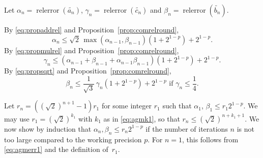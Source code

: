 \documentclass [11pt]{article}
\newcommand {\appro}[1]{\widetilde {#1}}
\newcommand{\relerror}{\operatorname {relerror}}
\renewcommand {\leq}{\leqslant}
\begin{document}
Let $\alpha_n = \relerror (\appro {a_n})$,
$\gamma_n = \relerror (\appro {c_n})$ and
$\beta_n = \relerror (\appro {b_n})$.

\noindent
By \eqref {eq:propaddrel} and Proposition~\ref {prop:comrelround},
\begin {equation}
\label {eq:agmalpha}
\alpha_n \leq
\sqrt 2 \, \max (\alpha_{n-1}, \beta_{n-1})
\left( 1 + 2^{1-p} \right) + 2^{1-p}.
\end {equation}
By \eqref {eq:propmulrel} and Proposition~\ref {prop:comrelround},
\begin {equation}
\label {eq:agmgamma}
\gamma_n \leq
\left( \alpha_{n-1} + \beta_{n-1} + \alpha_{n-1} \beta_{n-1} \right)
\left( 1 + 2^{1-p} \right) + 2^{1-p}.
\end {equation}
By \eqref {eq:propsqrt} and Proposition~\ref {prop:comrelround},
\begin {equation}
\label {eq:agmbeta}
\beta_n \leq
\frac {1}{\sqrt 3} \, \gamma_n (1 + 2^{1-p}) + 2^{1-p}
\text { if } \gamma_n \leq \frac {1}{4}.
\end {equation}

Let $r_n = \left( (\sqrt 2)^{n+1} - 1 \right) r_1$ for some integer $r_1$
such that $\alpha_1$, $\beta_1 \leq r_1 2^{1-p}$.
We may use $r_1 = (\sqrt 2)^{k_1}$ with $k_1$ as in \eqref {eq:agmk1},
so that $r_n \leq (\sqrt 2)^{n + k_1 + 1}$.
We now show by induction that
$\alpha_n, \beta_n \leq r_n 2^{1-p}$
if the number of iterations $n$ is not too large compared to
the working precision $p$.
For $n=1$, this follows from \eqref {eq:agmerr1} and the definition
of~$r_1$.
\end{document}
